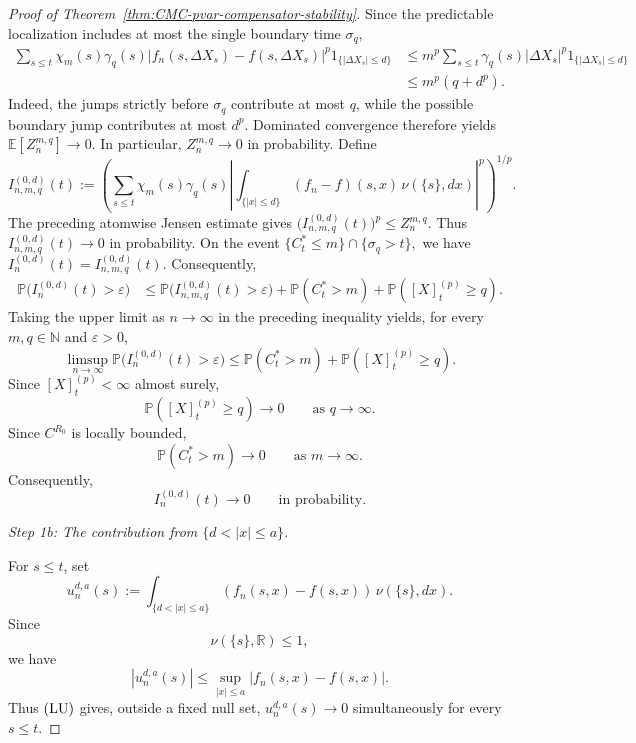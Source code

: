 \documentclass[a4paper,10pt]{article}
\newcommand{\E}{\mathbb E}
\renewcommand{\P}{\mathbb P}
\begin{document}
\begin{proof}[Proof of Theorem~\ref{thm:CMC-pvar-compensator-stability}]
Since the predictable localization includes at most the single
boundary time \(\sigma_q\),
\[
\begin{aligned}
\sum_{s\le t}
\chi_m(s)\gamma_q(s)
|f_n(s,\Delta X_s)-f(s,\Delta X_s)|^p
1_{\{|\Delta X_s|\le d\}}
&\le
m^p
\sum_{s\le t}
\gamma_q(s)
|\Delta X_s|^p
1_{\{|\Delta X_s|\le d\}}
\\
&\le
m^p(q+d^p).
\end{aligned}
\]
Indeed, the jumps strictly before \(\sigma_q\) contribute at most
\(q\), while the possible boundary jump contributes at most \(d^p\).
Dominated convergence therefore yields
$
        \E[Z_n^{m,q}]\longrightarrow0.
$
In particular,
$
        Z_n^{m,q}\longrightarrow0
$
in probability.
Define
\[
I_{n,m,q}^{(0,d)}(t)
:=
\left(
\sum_{s\le t}
\chi_m(s)\gamma_q(s)
\left|
\int_{\{|x|\le d\}}
(f_n-f)(s,x)\,\nu(\{s\},dx)
\right|^p
\right)^{1/p}.
\]
The preceding atomwise Jensen estimate gives
$
        \bigl(I_{n,m,q}^{(0,d)}(t)\bigr)^p
        \le Z_n^{m,q}.
$
Thus
$
        I_{n,m,q}^{(0,d)}(t)
        \longrightarrow0$
 in probability.
On the event
$
        \{C_t^*\le m\}\cap\{\sigma_q>t\},
$
we have
$
        I_n^{(0,d)}(t)=I_{n,m,q}^{(0,d)}(t).
$
Consequently,
\[
\begin{aligned}
\P\bigl(I_n^{(0,d)}(t)>\varepsilon\bigr)
&\le
\P\bigl(I_{n,m,q}^{(0,d)}(t)>\varepsilon\bigr)
+
\P(C_t^*>m)
+
\P([X]^{(p)}_t\ge q).
\end{aligned}
\]
Taking the upper limit as \(n\to\infty\) in the preceding
inequality yields, for every \(m,q\in\mathbb N\) and
\(\varepsilon>0\),
\[
\limsup_{n\to\infty}
\P\bigl(I_n^{(0,d)}(t)>\varepsilon\bigr)
\le
\P(C_t^*>m)
+
\P([X]^{(p)}_t\ge q).
\]
Since \([X]^{(p)}_t<\infty\) almost surely,
\[
        \P([X]^{(p)}_t\ge q)\longrightarrow0
        \qquad\text{as }q\to\infty.
\]
Since \(C^{R_0}\) is locally bounded,
\[
        \P(C_t^*>m)\longrightarrow0
        \qquad\text{as }m\to\infty.
\]
Consequently,
\[
        I_n^{(0,d)}(t)
        \longrightarrow0
        \qquad\text{in probability}.
\]

\medskip
\noindent
\textit{Step 1b: The contribution from \(\{d<|x|\le a\}\).}
\medskip

For \(s\le t\), set
\[
u_n^{d,a}(s)
:=
\int_{\{d<|x|\le a\}}
(f_n(s,x)-f(s,x))\,\nu(\{s\},dx).
\]
Since
\[
        \nu(\{s\},\mathbb R)\le1,
\]
we have
\[
|u_n^{d,a}(s)|
\le
\sup_{|x|\le a}|f_n(s,x)-f(s,x)|.
\]
Thus \({\rm (LU)}\) gives, outside a fixed null set,
$
        u_n^{d,a}(s)\longrightarrow0
$
simultaneously for every \(s\le t\).


\end{proof}
\end{document}
